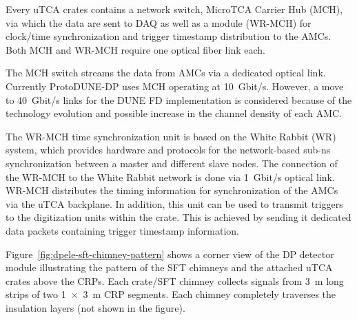 Every uTCA crates contains a network switch, MicroTCA Carrier Hub (MCH), via which the data are sent to DAQ as well as a module (WR-MCH) for clock/time synchronization and trigger timestamp distribution to the AMCs. Both MCH and WR-MCH require one optical fiber link each. 

The MCH switch streams the data from AMCs via a dedicated optical link. Currently ProtoDUNE-DP uses MCH operating at \SI{10}{Gbit/s}. However, a move to \SI{40}{Gbit/s} links for the DUNE FD implementation is considered because of the technology evolution and possible increase in the channel density of each AMC.

The WR-MCH time synchronization unit is based on the White Rabbit (WR) system, which provides hardware and protocols for the network-based sub-ns synchronization between a master and different slave nodes. The connection of the WR-MCH to the White Rabbit network is done via \SI{1}{Gbit/s} optical link. WR-MCH distributes the timing information for synchronization of the AMCs via the uTCA backplane. In addition, this unit can be used to transmit triggers to the digitization units within the crate. This is achieved by sending it dedicated data packets containing trigger timestamp information. 

Figure~\ref{fig:dpele-sft-chimney-pattern} shows a corner view of the DP detector module illustrating the pattern of the SFT chimneys and the attached uTCA crates above the CRPs. Each crate/SFT chimney collects signals from \SI{3}{\meter} long strips of two \SI[product-units=power]{1x3}{\meter} CRP segments. Each chimney completely traverses the insulation layers (not shown in the figure). 



